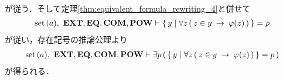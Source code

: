 \begin{sketch}
\begin{description}
\begin{align}
				\end{align}
				が従う．そして定理\ref{thm:equivalent_formula_rewriting_4}と併せて
				\begin{align}
					\operatorname*{set}\hspace{0.15em}(a),\ \mbox{{\bf EXT}},\mbox{{\bf EQ}},\mbox{\bf COM},\mbox{{\bf POW}} \vdash 
					\{\, y \mid \forall z\, (\, z \in y \hspace{0.25em}\rightarrow\hspace{0.25em} \varphi(z)\, )\, \} = \rho
				\end{align}
				が従い，存在記号の推論公理より
				\begin{align}
					\operatorname*{set}\hspace{0.15em}(a),\ \mbox{{\bf EXT}},\mbox{{\bf EQ}},\mbox{\bf COM},\mbox{{\bf POW}} \vdash \exists p\, 
					(\, \{\, y \mid \forall z\, (\, z \in y \hspace{0.25em}\rightarrow\hspace{0.25em} \varphi(z)\, )\, \} = p\, )
				\end{align}
				が得られる．
				\QED
		\end{description}
	\end{sketch}